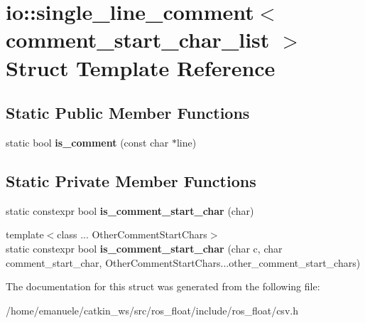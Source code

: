 \hypertarget{structio_1_1single__line__comment}{}\section{io\+:\+:single\+\_\+line\+\_\+comment$<$ comment\+\_\+start\+\_\+char\+\_\+list $>$ Struct Template Reference}
\label{structio_1_1single__line__comment}
\subsection*{Static Public Member Functions}
\begin{DoxyCompactItemize}
\item 
\mbox{\label{structio_1_1single__line__comment_ac4b029bb0efd251505f8e610cc308a92}} 
static bool {\bfseries is\+\_\+comment} (const char $\ast$line)
\end{DoxyCompactItemize}
\subsection*{Static Private Member Functions}
\begin{DoxyCompactItemize}
\item 
\mbox{\label{structio_1_1single__line__comment_a961a1b5c85dd2ec717ff483cb2206ade}} 
static constexpr bool {\bfseries is\+\_\+comment\+\_\+start\+\_\+char} (char)
\item 
\mbox{\label{structio_1_1single__line__comment_a9533453f729d2216f52af087e4411548}} 
{\footnotesize template$<$class ... Other\+Comment\+Start\+Chars$>$ }\\static constexpr bool {\bfseries is\+\_\+comment\+\_\+start\+\_\+char} (char c, char comment\+\_\+start\+\_\+char, Other\+Comment\+Start\+Chars...\+other\+\_\+comment\+\_\+start\+\_\+chars)
\end{DoxyCompactItemize}


The documentation for this struct was generated from the following file\+:\begin{DoxyCompactItemize}
\item 
/home/emanuele/catkin\+\_\+ws/src/ros\+\_\+float/include/ros\+\_\+float/csv.\+h\end{DoxyCompactItemize}
